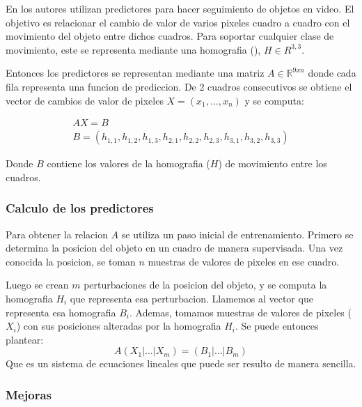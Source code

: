 \documentclass[a4paper,10pt]{article}
\begin{document}
En \cite{alp, original-linear-predictors} los autores utilizan predictores para
hacer seguimiento de objetos en video.  El objetivo es relacionar el cambio de
valor de varios pixeles cuadro a cuadro con el movimiento del objeto entre
dichos cuadros.  Para soportar cualquier clase de movimiento, este se
representa mediante una homografia (\cite{homography-estimation}), $H \in
R^{3,3}$.

Entonces los predictores se representan mediante una matriz $A \in
\mathbb{R}^{9xn}$ donde cada fila representa una funcion de prediccion.  De 2
cuadros consecutivos se obtiene el vector de cambios de valor de pixeles $X =
(x_1, \dots, x_n)$ y se computa:

\begin{eqnarray*}
    AX = B \\
    B = (h_{1,1}, h_{1,2}, h_{1,3}, h_{2,1}, h_{2,2}, h_{2,3}, h_{3,1}, h_{3,2}, h_{3,3})
\end{eqnarray*}

Donde $B$ contiene los valores de la homografia ($H$) de movimiento entre los cuadros.

\subsubsection{Calculo de los predictores}
Para obtener la relacion $A$ se utiliza un paso inicial de entrenamiento.
Primero se determina la posicion del objeto en un cuadro de manera supervisada.
Una vez conocida la posicion, se toman $n$ muestras de valores de pixeles en ese cuadro.

Luego se crean $m$ perturbaciones de la posicion del objeto, y se computa la homografia $H_i$ que representa esa perturbacion.
Llamemos al vector que representa esa homografia $B_i$.
Ademas, tomamos muestras de valores de pixeles ($X_i$) con sus posiciones alteradas por la homografia $H_i$.
Se puede entonces plantear:
\begin{equation}
    A \left( X_1 \lvert \dots \lvert X_m \right) = \left( B_1 \lvert \dots \lvert B_m \right)
\end{equation}
Que es un sistema de ecuaciones lineales que puede ser resulto de manera sencilla.

\subsubsection{Mejoras}
\end{document}
